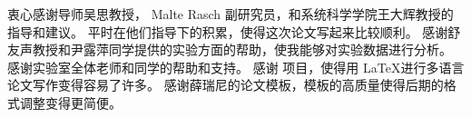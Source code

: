 
\begin{ack}
衷心感谢导师吴思教授， Malte Rasch 副研究员，和系统科学学院王大辉教授的指导和建议。
平时在他们指导下的积累，使得这次论文写起来比较顺利。
感谢舒友声教授和尹露萍同学提供的实验方面的帮助，使我能够对实验数据进行分析。
感谢实验室全体老师和同学的帮助和支持。
感谢 \XeLaTeX 项目，使得用 \LaTeX 进行多语言论文写作变得容易了许多。
感谢薛瑞尼的论文模板，模板的高质量使得后期的格式调整变得更简便。
\end{ack}
